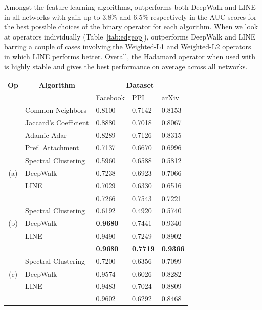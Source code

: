Amongst the feature learning algorithms, \nodevec outperforms both DeepWalk and LINE in all networks with gain up to 3.8\% and 6.5\% respectively in the AUC scores for the best possible choices of the binary operator for each algorithm. When we look at operators individually (Table~\ref{tab:edgeop}), \nodevec outperforms DeepWalk and LINE barring a couple of cases involving the Weighted-L1 and Weighted-L2 operators in which LINE performs better. Overall, the Hadamard operator when used with \nodevec is highly stable and gives the best performance on average across all networks. 

\begin{table}[h]
\centering
	\begin{tabular}{c|l|l|l|l}
	\multicolumn{1}{c}{\textbf{Op}} & \multicolumn{1}{c}{\textbf{Algorithm}} & \multicolumn{3}{c}{\textbf{Dataset}}      \\ 
	         			    & & Facebook     & PPI    & arXiv      \\ \hline
	& Common Neighbors        & 0.8100 & 0.7142 & 0.8153 \\
	& Jaccard's Coefficient   & 0.8880 & 0.7018 & 0.8067 \\
	& Adamic-Adar             & 0.8289 & 0.7126 & 0.8315 \\
	& Pref. Attachment 		  & 0.7137 & 0.6670 & 0.6996 \\ \hline
	& Spectral Clustering     & 0.5960 & 0.6588 & 0.5812 \\
	(a) & DeepWalk            & 0.7238 & 0.6923 & 0.7066 \\ %
	& LINE 			  		  & 0.7029 & 0.6330 & 0.6516 \\
	& \nodevec 		  		  & 0.7266 & 0.7543 & 0.7221 \\ \hline 
	& Spectral Clustering     & 0.6192 & 0.4920 & 0.5740 \\
	(b) & DeepWalk            & \textbf{0.9680} & 0.7441 & 0.9340 \\ %
	& LINE 			  		  & 0.9490 & 0.7249 & 0.8902  \\
	& \nodevec 		  		  & \textbf{0.9680} & \textbf{0.7719} & \textbf{0.9366}\\ \hline 
	& Spectral Clustering     & 0.7200 & 0.6356 & 0.7099\\
	(c) & DeepWalk            & 0.9574 & 0.6026 & 0.8282 \\ %
	& LINE 			  		  & 0.9483 & 0.7024 & 0.8809 \\
	& \nodevec 	      		  & 0.9602 & 0.6292 & 0.8468 \\ \hline 

\end{tabular}
\end{table}
